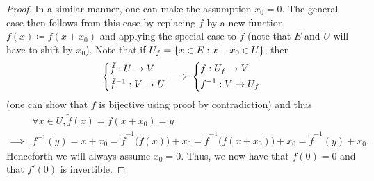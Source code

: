 \begin{proof}
  In a similar manner, one can make the assumption \(x_0 = 0\).
  The general case then follows from this case by replacing \(f\) by a new function
  \(\tilde{f}(x) \coloneqq f(x + x_0)\) and applying the special case to \(\tilde{f}\)
  (note that \(E\) and \(U\) will have to shift by \(x_0\)).
  Note that if \(U_f = \left\lbrace x \in E : x - x_0 \in U\right\rbrace\), then
  \[
    \begin{dcases}
      \tilde{f} : U \to V \\
      \tilde{f}^{-1} : V \to U
    \end{dcases} \implies \begin{dcases}
      f : U_f \to V \\
      f^{-1} : V \to U_f
    \end{dcases}
  \]
  (one can show that \(f\) is bijective using proof by contradiction)
  and thus
  \begin{align*}
             & \forall x \in U, \tilde{f}(x) = f(x + x_0) = y                                                                                         \\
    \implies & f^{-1}(y) = x + x_0 = \tilde{f}^{-1}\big(\tilde{f}(x)\big) + x_0 = \tilde{f}^{-1}\big(f(x + x_0)\big) + x_0 = \tilde{f}^{-1}(y) + x_0.
  \end{align*}
  Henceforth we will always assume \(x_0 = 0\).
  Thus, we now have that \(f(0) = 0\) and that \(f'(0)\) is invertible.


\end{proof}
